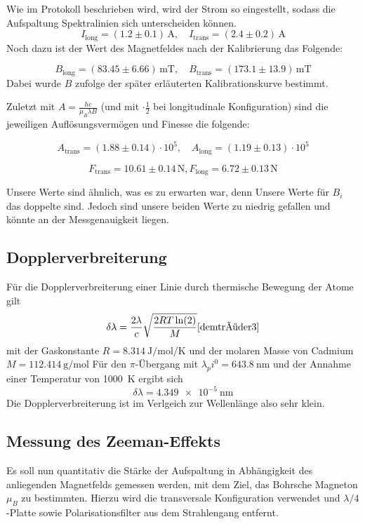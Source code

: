 \documentclass{article}
\begin{document}
\begin{multicols}{2}
Wie im Protokoll beschrieben wird, wird der Strom so eingestellt, sodass die Aufspaltung
Spektralinien sich unterscheiden können.
\[
I_{\text{long}} = (1.2 \pm 0.1) \, \text{A}, \quad I_{\text{trans}} = (2.4 \pm 0.2) \, \text{A}
\]
Noch dazu ist der Wert des Magnetfeldes nach der Kalibrierung das Folgende: 

\[
B_{\text{long}} = ( 83.45 \pm 6.66) \, \text{mT}, \quad B_{\text{trans}} = (173.1 \pm 13.9) \, \text{mT}
\]
Dabei wurde $B$ zufolge der später erläuterten Kalibrationskurve bestimmt.

Zuletzt mit $A=\frac{hc}{\mu_B \lambda B}$ (und mit $\cdot \frac{1}{2}$ bei longitudinale 
Konfiguration) sind die jeweiligen Auflösungsvermögen und Finesse die folgende:

\[
A_{\text{trans}} = (1.88 \pm 0.14) \cdot 10^5, \quad A_{\text{long}} = (1.19 \pm 0.13) \cdot 10^5
\]

\[
  F_{\text{trans}} = 10.61 \pm 0.14 \, \text{N}, F_{\text{long}} = 6.72 \pm 0.13 \, \text{N}
\]

Unsere Werte sind ähnlich, was es zu erwarten war, denn Unsere Werte für 
$B_i$ das doppelte sind. Jedoch sind unsere beiden Werte zu niedrig gefallen und 
könnte an der Messgenauigkeit liegen. 

\subsection{Dopplerverbreiterung}
Für die Dopplerverbreiterung einer Linie durch thermische Bewegung der Atome gilt
\[
  \delta\lambda = \frac{2\lambda}{c} \sqrt{\frac{2RT\ln(2)}{M}} \cite[S. 230]{demtröder3}
\]
mit der Gaskonstante $R=\SI{8.314}{\J\per\mol\per\K}$ und der molaren Masse von Cadmium $M=\SI{112.414}{\g\per\mol}$ \cite{chemistry}
Für den $\pi$-Übergang mit $\lambda_pi^0 = \SI{643.8}{\nm}$ und der Annahme einer Temperatur von \SI{1000}{\K} ergibt sich
\[
  \delta\lambda = \SI{4.349e-5}{\nm}
\]
Die Dopplerverbreiterung ist im Verlgeich zur Wellenlänge also sehr klein.


\subsection{Messung des Zeeman-Effekts}
Es soll nun quantitativ die Stärke der Aufspaltung in Abhängigkeit des anliegenden Magnetfelds gemessen werden,
mit dem Ziel, das Bohrsche Magneton $\mu_B$ zu bestimmten.
Hierzu wird die transversale Konfiguration verwendet und $\lambda/4$-Platte sowie Polarisationsfilter aus dem Strahlengang entfernt.


\end{multicols}
\end{document}
